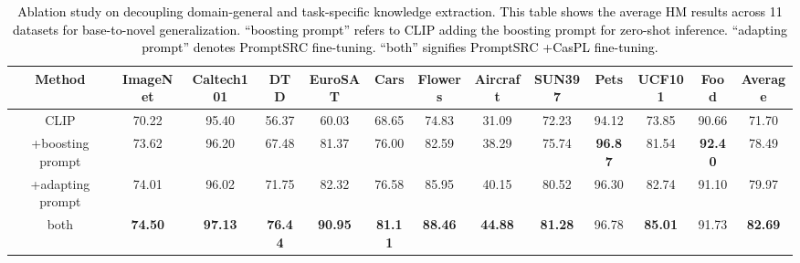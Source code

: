 \documentclass[runningheads]{llncs}
\newcommand{\rewrite}[1]{\textcolor{black}{#1}}%
\begin{document}
{{\begin{table}[t]
    \centering
    \caption{\rewrite{Ablation study on decoupling domain-general and task-specific knowledge extraction. This table shows the average HM results across 11 datasets for base-to-novel generalization. ``boosting prompt'' refers to CLIP adding the boosting prompt for zero-shot inference. ``adapting prompt'' denotes PromptSRC fine-tuning. ``both'' signifies PromptSRC +CasPL fine-tuning.}}
    \resizebox{1\linewidth}{!}
    {
        \begin{tabular}{c|cccccccccccc}
        \hline
        Method      & ImageNet & Caltech101 & DTD   & EuroSAT & Cars & Flowers & Aircraft & SUN397 & Pets & UCF101 & Food & Average \\
        \hline
        CLIP        & 70.22    & 95.40      & 56.37 & 60.03   & 68.65        & 74.83      & 31.09        & 72.23  & 94.12      & 73.85  & 90.66   & 71.70   \\
        \hline
        +boosting prompt      & 73.62    & 96.20      & 67.48 & 81.37   & 76.00        & 82.59      & 38.29        & 75.74  & \textbf{96.87}      & 81.54  & \textbf{92.40}   & 78.49   \\
        +adapting prompt   & 74.01    &  96.02      & 71.75 & 82.32   & 76.58        & 85.95      & 40.15        & 80.52  &  96.30      & 82.74  & 91.10   & 79.97   \\
        both   & \textbf{74.50}    & \textbf{97.13}      & \textbf{76.44} & \textbf{90.95}   & \textbf{81.11}        & \textbf{88.46}      & \textbf{44.88}        & \textbf{81.28}  & 96.78      & \textbf{85.01}  & 91.73   & \textbf{82.69}   \\
        \hline
        \end{tabular}
    }
    \label{table:multi-phase-analyse}
\end{table}


}}
\end{document}
